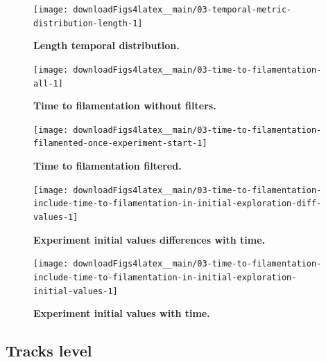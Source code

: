 \documentclass[a4paper, nobind]{templates/ociamthesis}
\begin{document}
\begin{figure}[H]
\texttt{[image: downloadFigs4latex\_\_main/03-temporal-metric-distribution-length-1]} \caption[Length temporal distribution.]{\textbf{Length temporal distribution.}}\label{fig:03-temporal-metric-distribution-length-1}
\end{figure}





\begin{figure}[H]
\texttt{[image: downloadFigs4latex\_\_main/03-time-to-filamentation-all-1]} \caption[Time to filamentation without filters.]{\textbf{Time to filamentation without filters.}}\label{fig:03-time-to-filamentation-all-1}
\end{figure}





\begin{figure}[H]
\texttt{[image: downloadFigs4latex\_\_main/03-time-to-filamentation-filamented-once-experiment-start-1]} \caption[Time to filamentation filtered.]{\textbf{Time to filamentation filtered.}}\label{fig:03-time-to-filamentation-filamented-once-experiment-start-1}
\end{figure}





\begin{figure}[H]
\texttt{[image: downloadFigs4latex\_\_main/03-time-to-filamentation-include-time-to-filamentation-in-initial-exploration-diff-values-1]} \caption[Experiment initial values differences with time.]{\textbf{Experiment initial values differences with time.}}\label{fig:03-time-to-filamentation-include-time-to-filamentation-in-initial-exploration-diff-values-1}
\end{figure}





\begin{figure}[H]
\texttt{[image: downloadFigs4latex\_\_main/03-time-to-filamentation-include-time-to-filamentation-in-initial-exploration-initial-values-1]} \caption[Experiment initial values with time.]{\textbf{Experiment initial values with time.}}\label{fig:03-time-to-filamentation-include-time-to-filamentation-in-initial-exploration-initial-values-1}
\end{figure}

\hypertarget{tracks-level}{%
\subsection{Tracks level}\label{tracks-level}}
\end{document}
